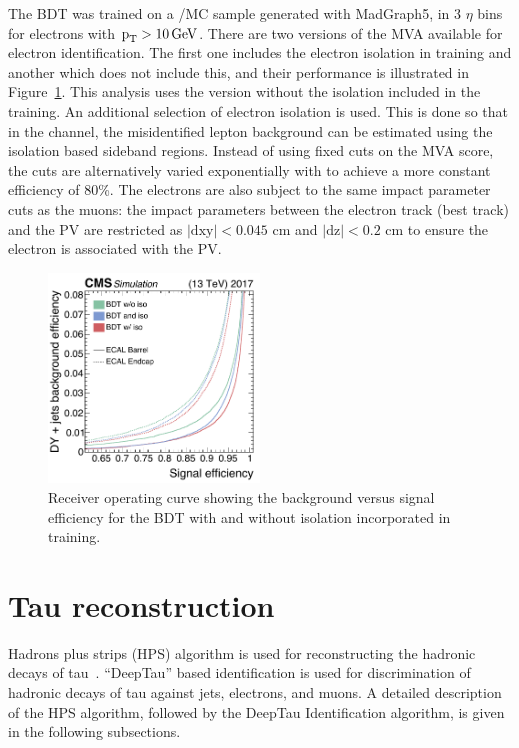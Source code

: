 The BDT was trained on a \PZ/\Pgg MC sample generated with MadGraph5, in 3 $\eta$ bins for electrons with $\text{p}_\text{T} > 10 \,\text{Ge\hspace{-.08em}V}$. There are two versions of the MVA available for electron identification. The first one includes the electron isolation in training and another which does not include this, and their performance is illustrated in Figure~\ref{fig:elec_BDT}. This analysis uses the version without the isolation included in the training. An additional selection of electron isolation is used. This is done so that in the \ehad channel, the misidentified lepton background can be estimated using the isolation based sideband regions. Instead of using fixed cuts on the MVA score, the cuts are alternatively varied exponentially with \pt to achieve a more constant efficiency of 80\%. The electrons are also subject to the same impact parameter cuts as the muons: the impact parameters between the electron track (best track) and the PV are restricted as $|\text{dxy}| < 0.045$ cm and $|\text{dz}| < 0.2$ cm to ensure the electron is associated with the PV.

\begin{figure}[!htpb]
  \centering
  \includegraphics[width=0.5\textwidth]{plots/chapter5/BDT.png}
  \caption{Receiver operating curve showing the background versus signal efficiency for the BDT with and without isolation incorporated in training.}
  \label{fig:elec_BDT}
\end{figure}

\section{Tau reconstruction}

Hadrons plus strips (HPS) algorithm is used for reconstructing the hadronic decays of tau~\cite{Sirunyan:2018pgf}. ``DeepTau'' based identification is used for discrimination of hadronic decays of tau against jets, electrons, and muons. A detailed description of the HPS algorithm, followed by the DeepTau Identification algorithm, is given in the following subsections.

